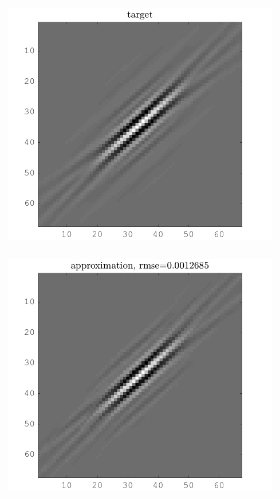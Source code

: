 \begin{figure}[!h]\centering
\begin{subfigure}[b]{0.4\textwidth}\centering
	\begin{subfigure}[b]{1\textwidth}\centering
	\includegraphics[width=\textwidth]{figures/variable_support/xp_128x128_sc2_angl1_K3_S3_node4_variable_support_target.png}
	\end{subfigure}
	\begin{subfigure}[b]{1\textwidth}\centering
	\includegraphics[width=\textwidth]{figures/variable_support/xp_128x128_sc2_angl1_K3_S3_node4_variable_support_approx.png}

\end{subfigure}
\end{subfigure}
\end{figure}

